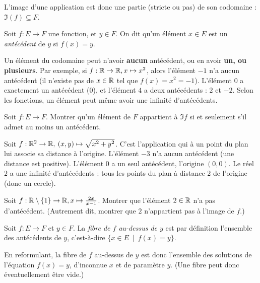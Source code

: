 L'image d'une application est donc une partie (stricte ou pas) de son codomaine : $\Im(f)\subseteq F$.

\begin{definition}
Soit $f : E\to F$ une fonction, et $y\in F$. On dit qu'un élément $x\in E$ est un \emph{antécédent} de $y$ si $f(x)=y$.
\end{definition}

\begin{attention}
Un élément du codomaine peut n'avoir \textbf{aucun} antécédent, ou en avoir \textbf{un, ou plusieurs}. Par exemple, si $f : \mathbb{R}\to \mathbb{R}, x\mapsto x^2$, alors l'élément $-1$ n'a aucun antécédent (il n'existe pas de $x\in \mathbb{R}$ tel que $f(x)=x^2=-1$). L'élément $0$ a exactement un antécédent ($0$), et l'élément $4$ a deux antécédents : $2$ et $-2$. Selon les fonctions, un élément peut même avoir une infinité d'antécédents.
\end{attention}

\begin{exercice}
Soit $f : E\to F$. Montrer qu'un élément de $F$ appartient à $\Im f$ si et seulement s'il admet au moins un antécédent.
\end{exercice}

\begin{exemple}
Soit $f : \mathbb{R}^2\to \mathbb{R},\: (x,y)\mapsto \sqrt{x^2+y^2}$. C'est l'application qui à un point du plan lui associe sa distance à l'origine. L'élément $-3$ n'a aucun antécédent (une distance est positive). L'élément $0$ a un seul antécédent, l'origine $(0,0)$. Le réel $2$ a une infinité d'antécédents : tous les points du plan à distance $2$ de l'origine (donc un cercle).
\end{exemple}

\begin{exercice}
Soit $f : \mathbb{R}\setminus \{1\} \to \mathbb{R}, x\mapsto \frac{2x}{x-1}$. Montrer que l'élément $2 \in \mathbb{R}$ n'a pas d'antécédent. (Autrement dit, montrer que $2$ n'appartient pas à l'image de $f$.)
\end{exercice}


\begin{definition}
Soit $f : E\to F$ et $y\in F$. La \emph{fibre de $f$ au-dessus de $y$} est par définition l'ensemble des antécédents de $y$, c'est-à-dire $\{x\in E \:\mid\: f(x)=y\}$.

En reformulant, la fibre de $f$ au-dessus de $y$ est donc l'ensemble des solutions de l'équation $f(x)=y$, d'inconnue $x$ et de paramètre $y$. (Une fibre peut donc éventuellement être vide.)
\end{definition}

